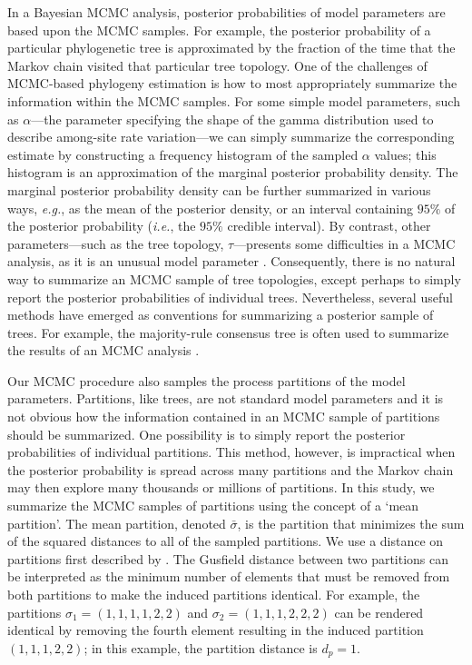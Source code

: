 \documentclass[11pt]{article}
\begin{document}
In a Bayesian MCMC analysis, posterior probabilities of model parameters are based upon the MCMC samples. 
For example, the posterior probability of a particular phylogenetic tree is approximated by the fraction of the time that the Markov chain visited that particular tree topology. 
One of the challenges of MCMC-based phylogeny estimation is how to most appropriately summarize the information within the MCMC samples.
For some simple model parameters, such as  $\alpha$---the parameter specifying the shape of the gamma distribution used to describe among-site rate variation---we can simply summarize the corresponding estimate by constructing a frequency histogram of the sampled $\alpha$ values; this histogram is an approximation of the marginal posterior probability density.
The marginal posterior probability density can be further summarized in various ways, {\it e.g.}, as the mean of the posterior density, or an interval containing $95\%$ of the posterior probability ({\it i.e.},  the $95\%$ credible interval).
By contrast, other parameters---such as the tree topology, $\tau$---presents some difficulties in a MCMC analysis, as it is an unusual model parameter \citep[][]{yang95b}.
Consequently, there is no natural way to summarize an MCMC sample of tree topologies, except perhaps to simply report the posterior probabilities of individual trees.
Nevertheless, several useful methods have emerged as conventions for summarizing a posterior sample of trees.
For example, the majority-rule consensus tree is often used to summarize the results of an MCMC analysis \citep[in the same way that bootstrap samples are summarized;][]{felsenstein85a}.

Our MCMC procedure also samples the process partitions of the model parameters.
Partitions, like trees, are not standard model parameters and it is not obvious how the information contained in an MCMC sample of partitions should be summarized.
One possibility is to simply report the posterior probabilities of individual partitions.
This method, however, is impractical when the posterior probability is spread across many partitions and the Markov chain may then explore many thousands or millions of partitions.
In this study, we summarize the MCMC samples of partitions using the concept of a `mean partition'. 
The mean partition, denoted $\bar{\sigma}$, is the partition that minimizes the sum of the squared distances to all of the sampled partitions.
We use a distance on partitions first described by \citet{gusfield02}.
The Gusfield distance between two partitions can be interpreted as the minimum number of elements that must be removed from both partitions to make the induced partitions identical. 
For example, the partitions $\sigma_1 = (1,1,1,1,2,2)$ and $\sigma_2 = (1,1,1,2,2,2)$ can be rendered identical by removing the fourth element resulting in the induced partition $(1,1,1,2,2)$; in this example, the partition distance is $d_p = 1$.
\end{document}
